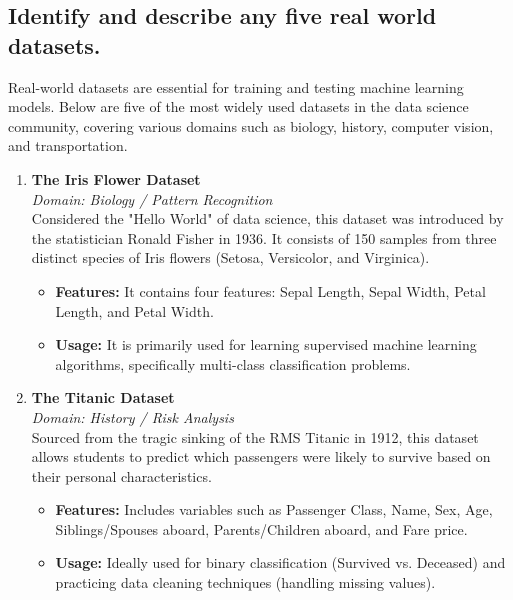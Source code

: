 \documentclass[a4paper,12pt]{article}
\begin{document}
\subsection{Identify and describe any five real world datasets.}

Real-world datasets are essential for training and testing machine learning models. Below are five of the most widely used datasets in the data science community, covering various domains such as biology, history, computer vision, and transportation.

\begin{enumerate}
    \item \textbf{The Iris Flower Dataset} \\
    \textit{Domain: Biology / Pattern Recognition} \\
    Considered the "Hello World" of data science, this dataset was introduced by the statistician Ronald Fisher in 1936. It consists of 150 samples from three distinct species of Iris flowers (Setosa, Versicolor, and Virginica).
    \begin{itemize}
        \item \textbf{Features:} It contains four features: Sepal Length, Sepal Width, Petal Length, and Petal Width.
        \item \textbf{Usage:} It is primarily used for learning supervised machine learning algorithms, specifically multi-class classification problems.
    \end{itemize}

    \item \textbf{The Titanic Dataset} \\
    \textit{Domain: History / Risk Analysis} \\
    Sourced from the tragic sinking of the RMS Titanic in 1912, this dataset allows students to predict which passengers were likely to survive based on their personal characteristics.
    \begin{itemize}
        \item \textbf{Features:} Includes variables such as Passenger Class, Name, Sex, Age, Siblings/Spouses aboard, Parents/Children aboard, and Fare price.
        \item \textbf{Usage:} Ideally used for binary classification (Survived vs. Deceased) and practicing data cleaning techniques (handling missing values).
    \end{itemize}


\end{enumerate}
\end{document}
